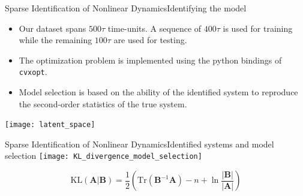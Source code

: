 \begin{frame}[t, c]{Sparse Identification of Nonlinear Dynamics}{Identifying the model}
  \begin{minipage}{.68\textwidth}
    \begin{itemize}
    \item Our dataset spans \( 500 \tau \) time-units.
      A sequence of \( 400 \tau \) is used for training while the remaining \( 100 \tau \) are used for testing.
      
      \medskip
      
    \item The optimization problem is implemented using the python bindings of \texttt{cvxopt}.
      
      \medskip
      
    \item Model selection is based on the ability of the identified system to reproduce the second-order statistics of the true system.
    \end{itemize}
  \end{minipage}%
  \hfill
  \begin{minipage}{.28\textwidth}
    \centering
    \texttt{[image: latent\_space]}
  \end{minipage}
  
  \vspace{1cm}
\end{frame}

\begin{frame}[t, c]{Sparse Identification of Nonlinear Dynamics}{Identified systems and model selection}
  \centering
  \texttt{[image: KL\_divergence\_model\_selection]}
  
  {\small
    \[
      \textrm{KL}(\bm{A} \vert \bm{B}) = \frac{1}{2} \left( \textrm{Tr}(\bm{B}^{-1}\bm{A}) - n + \ln \frac{\vert \bm{B} \vert}{\vert \bm{A} \vert} \right)
    \]
  }
  
  \vspace{1cm}
\end{frame}

